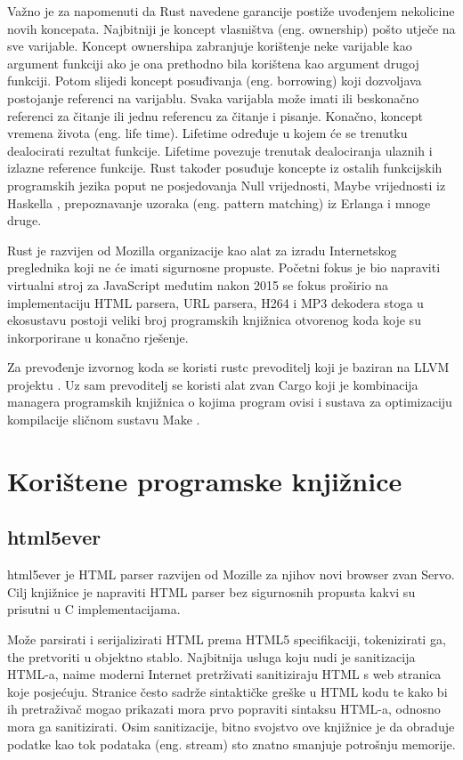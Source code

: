 \documentclass[times, utf8, zavrsni]{fer}
\begin{document}
Važno je za napomenuti da Rust navedene garancije postiže uvođenjem nekolicine
novih koncepata. Najbitniji je koncept vlasništva (eng. ownership) pošto utječe
na sve varijable. Koncept ownershipa zabranjuje korištenje neke varijable kao
argument funkciji ako je ona prethodno bila korištena kao argument drugoj
funkciji. Potom slijedi koncept posuđivanja (eng. borrowing) koji dozvoljava
postojanje referenci na varijablu. Svaka varijabla može imati ili beskonačno
referenci za čitanje ili jednu referencu za čitanje i pisanje. Konačno, koncept
vremena života (eng. life time). Lifetime određuje u kojem će se trenutku
dealocirati rezultat funkcije. Lifetime povezuje trenutak dealociranja ulaznih i
izlazne reference funkcije. Rust također posuđuje koncepte iz ostalih
funkcijskih programskih jezika poput ne posjedovanja Null vrijednosti, Maybe
vrijednosti iz Haskella \cite{haskell_lang_page}, prepoznavanje uzoraka
(eng. pattern matching) iz Erlanga \cite{erlang_lang_page} i mnoge druge.

Rust je razvijen od Mozilla organizacije kao alat za izradu Internetskog
preglednika koji ne će imati sigurnosne propuste. Početni fokus je bio
napraviti virtualni stroj za JavaScript međutim nakon 2015 se fokus proširio na
implementaciju HTML parsera, URL parsera, H264 i MP3 dekodera stoga u ekosustavu
postoji veliki broj programskih knjižnica otvorenog koda koje su inkorporirane
u konačno rješenje.

Za prevođenje izvornog koda se koristi rustc prevoditelj koji je baziran na
LLVM projektu \cite{llvm_page}. Uz sam prevoditelj se koristi alat zvan
Cargo \cite{cargo_documentation}
koji je kombinacija managera programskih knjižnica o kojima program ovisi i
sustava za optimizaciju kompilacije sličnom sustavu
Make \cite{make_documentation}.

\section{Korištene programske knjižnice}

\subsection{html5ever}

html5ever \cite{html5ever_repository} je HTML parser razvijen od Mozille za
njihov novi browser zvan Servo.
Cilj knjižnice je napraviti HTML parser bez sigurnosnih propusta kakvi su
prisutni u C implementacijama.

Može parsirati i serijalizirati HTML prema HTML5 specifikaciji, tokenizirati ga,
the pretvoriti u objektno stablo. Najbitnija usluga koju nudi je sanitizacija
HTML-a, naime moderni Internet pretrživati sanitiziraju HTML s web stranica
koje posjećuju. Stranice često sadrže sintaktičke greške u HTML kodu te kako
bi ih pretraživač mogao prikazati mora prvo popraviti sintaksu HTML-a,
odnosno mora ga sanitizirati. Osim sanitizacije, bitno svojstvo ove
knjižnice je da obraduje podatke kao tok podataka (eng. stream) sto znatno
smanjuje potrošnju memorije.
\end{document}
